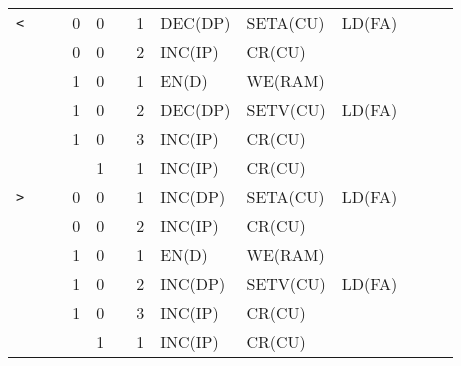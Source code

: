 \begin{longtable}[c] {c|ccccc|c|llllll}
    \rowcolor{Gray}  \texttt{<}   &   &   & 0 & 0     &      & 1     & DEC(DP)   & SETA(CU) & LD(FA)  &        &        &        \\
    \rowcolor{Gray}               &   &   & 0 & 0     &      & 2     & INC(IP)  & CR(CU)   &         &        &        &        \\    
    \rowcolor{White}              &   &   & 1 & 0     &      & 1     & EN(D)    & WE(RAM)  &         &        &        &        \\
    \rowcolor{White}              &   &   & 1 & 0     &      & 2     & DEC(DP)   & SETV(CU) & LD(FA)  &        &        &        \\
    \rowcolor{White}              &   &   & 1 & 0     &      & 3     & INC(IP)  & CR(CU)   &         &        &        &        \\
    \rowcolor{Gray}               &   &   &   & 1     &      & 1     & INC(IP)  & CR(CU)   &         &        &        &        \\ \hline

    \rowcolor{Gray}  \texttt{>}   &   &   & 0 & 0     &      & 1     & INC(DP)   & SETA(CU) & LD(FA)  &        &        &        \\
    \rowcolor{Gray}               &   &   & 0 & 0     &      & 2     & INC(IP)  & CR(CU)   &         &        &        &        \\    
    \rowcolor{White}              &   &   & 1 & 0     &      & 1     & EN(D)    & WE(RAM)  &         &        &        &        \\
    \rowcolor{White}              &   &   & 1 & 0     &      & 2     & INC(DP)   & SETV(CU) & LD(FA)  &        &        &        \\
    \rowcolor{White}              &   &   & 1 & 0     &      & 3     & INC(IP)  & CR(CU)   &         &        &        &        \\
    \rowcolor{Gray}               &   &   &   & 1     &      & 1     & INC(IP)  & CR(CU)   &         &        &        &        \\ \hline


\end{longtable}
